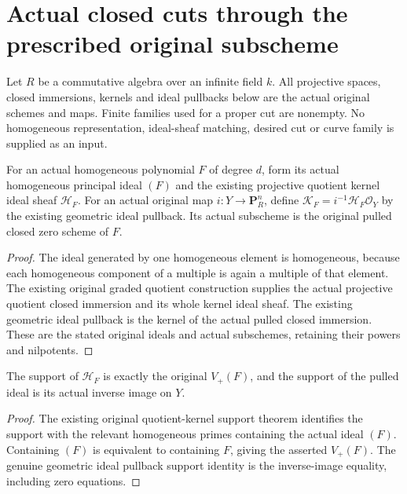\section{Actual closed cuts through the prescribed original subscheme}
Let $R$ be a commutative algebra over an infinite field $k$. All
projective spaces, closed immersions, kernels and ideal pullbacks below
are the actual original schemes and maps. Finite families used for a
proper cut are nonempty. No homogeneous representation, ideal-sheaf
matching, desired cut or curve family is supplied as an input.

\begin{definition}
\label{def:pl-gauss-original-homogeneous-cut}
\leanok
For an actual homogeneous polynomial $F$ of degree $d$, form its actual
homogeneous principal ideal $(F)$ and the existing projective quotient
kernel ideal sheaf $\mathcal H_F$. For an actual original map
$i:Y\to\mathbf P^n_R$, define $\mathcal K_F=i^{-1}\mathcal H_F\mathcal O_Y$
by the existing geometric ideal pullback. Its actual subscheme is the
original pulled closed zero scheme of $F$.
\end{definition}
\begin{proof}
The ideal generated by one homogeneous element is homogeneous, because
each homogeneous component of a multiple is again a multiple of that
element. The existing original graded quotient construction supplies the
actual projective quotient closed immersion and its whole kernel ideal
sheaf. The existing geometric ideal pullback is the kernel of the
actual pulled closed immersion. These are the stated original ideals
and actual subschemes, retaining their powers and nilpotents.
\end{proof}

\begin{lemma}
\label{lem:pl-gauss-original-homogeneous-cut-support}
\leanok
The support of $\mathcal H_F$ is exactly the original $V_+(F)$, and
the support of the pulled ideal is its actual inverse image on $Y$.
\end{lemma}
\begin{proof}
The existing original quotient-kernel support theorem identifies the
support with the relevant homogeneous primes containing the actual
ideal $(F)$. Containing $(F)$ is equivalent to containing $F$, giving
the asserted $V_+(F)$. The genuine geometric ideal pullback support
identity is the inverse-image equality, including zero equations.
\end{proof}

